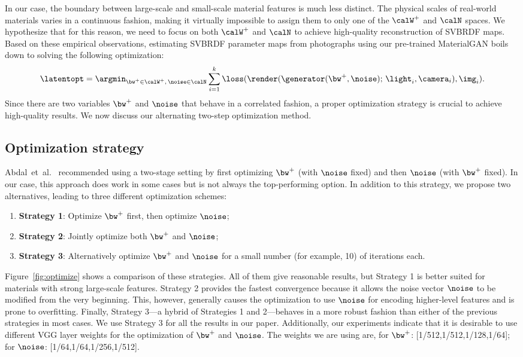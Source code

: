 %
In our case, the boundary between large-scale and small-scale material features is much less distinct.
The physical scales of real-world materials varies in a continuous fashion, making it virtually impossible to assign them to only one of the $\calW^+$ and $\calN$ spaces.
We hypothesize that for this reason, we need to focus on both $\calW^+$ and $\calN$ to achieve high-quality reconstruction of SVBRDF maps.
%
Based on these empirical observations, estimating SVBRDF parameter maps from photographs using our pre-trained MaterialGAN boils down to solving the following optimization:
%
\begin{equation}
	\latentopt = \argmin_{\bw^+ \in \calW^+,\, \noise \in \calN} \sum_{i=1}^k \loss(\render(\generator(\bw^+, \noise); \,\light_i, \camera_i), \img_i).
\end{equation}
%
Since there are two variables $\bw^+$ and $\noise$ that behave in a correlated fashion, a proper optimization strategy is crucial to achieve high-quality results. We now discuss our alternating two-step optimization method.
%
\subsection{Optimization strategy}
\label{ssec:optim}
%
Abdal~et~al.~ recommended using a two-stage setting by first optimizing $\bw^+$ (with $\noise$ fixed) and then $\noise$ (with $\bw^+$ fixed).
In our case, this approach does work in some cases but is not always the top-performing option.
In addition to this strategy, we propose two alternatives, leading to three different optimization schemes:
%
\begin{enumerate}
	\item \textbf{Strategy 1}: Optimize $\bw^+$ first, then optimize $\noise$;
	\item \textbf{Strategy 2}: Jointly optimize both $\bw^+$ and $\noise$;
	\item \textbf{Strategy 3}: Alternatively optimize $\bw^+$ and $\noise$ for a small number (for example, 10) of iterations each.
\end{enumerate}
%
Figure~\ref{fig:optimize} shows a comparison of these strategies.
All of them give reasonable results, but Strategy 1 is better suited for materials with strong large-scale features.
Strategy 2 provides the fastest convergence because it allows the noise vector $\noise$ to be modified from the very beginning.
This, however, generally causes the optimization to use $\noise$ for encoding higher-level features and is prone to overfitting.
Finally, Strategy 3---a hybrid of Strategies 1 and 2---behaves in a more robust fashion than either of the previous strategies in most cases.
We use Strategy 3 for all the results in our paper.
Additionally, our experiments indicate that it is desirable to use different VGG layer weights for the optimization of $\bw^+$ and $\noise$. The weights we are using are, for $\bw^+$: [1/512,1/512,1/128,1/64]; for $\noise$: [1/64,1/64,1/256,1/512].
%

%
